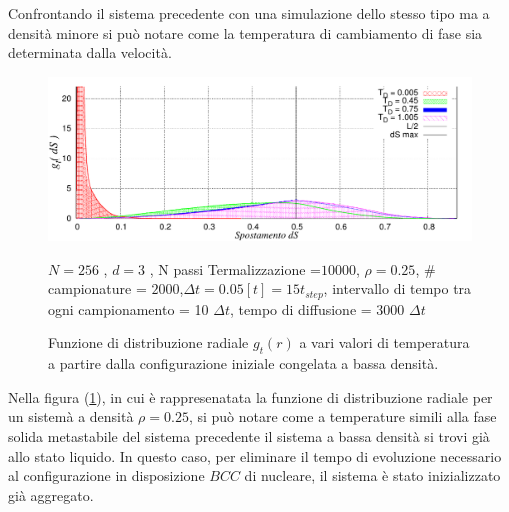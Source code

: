 Confrontando il sistema precedente con una simulazione dello stesso tipo ma a densità minore si può notare come la temperatura di cambiamento di fase sia determinata dalla velocità.
	\begin{figure}[htbp]
		\centering
		\caption[Sfere Soffici$/$Problema11$\_$v2B.cpp]{Funzione di distribuzione radiale $g_t(r)$ a vari valori di temperatura a partire dalla configurazione iniziale congelata a bassa densità.}\label{fig: Problema11_v2B}\vspace{-15pt}

		\includegraphics[scale=0.95]{Immagini/Soffici/DistrodS_RhoBassa_3D}

		\centering  \footnotesize{$N= 256$ , $d=3$ , N passi Termalizzazione =$ 10000$, $\rho = 0.25$, $\#$ campionature = $ 2000$,\newline $\Delta t = 0.05 [t] = 15 t_{step}$, intervallo di tempo tra ogni campionamento = 10 $\Delta t$, tempo di diffusione = 3000 $\Delta t$}
	\end{figure}
Nella figura (\ref{fig: Problema11_v2B}), in cui è rappresenatata la funzione di distribuzione radiale per un sistemà a densità  $\rho = 0.25$, si può notare come a temperature simili alla fase solida metastabile del sistema precedente il sistema a bassa densità si trovi già allo stato liquido. In questo caso, per eliminare il tempo  di evoluzione necessario al configurazione in disposizione $BCC$ di nucleare, il sistema è stato inizializzato già aggregato.

\medskip

